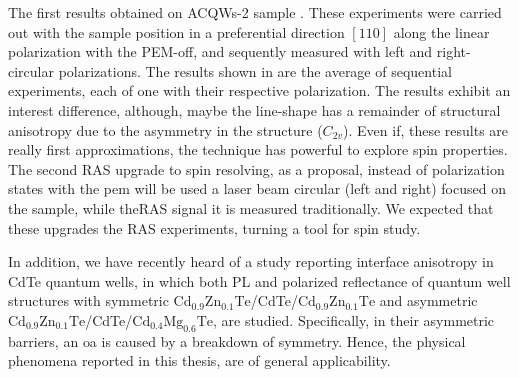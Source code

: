 The first results obtained on \gls{ACQWs}-2 sample  . 
These experiments were carried out with the sample position in a preferential direction  $[110]$ along the linear polarization with the PEM-off, and sequently measured with left and right- circular polarizations.
The results shown in  are the average of sequential experiments, each of one with
their respective polarization. The results exhibit an interest difference, although,
maybe the line-shape has a remainder of structural anisotropy due to the asymmetry in
the structure ($C_{2v}$).  Even if, these results are really first approximations, the technique has powerful to explore spin properties. The second RAS upgrade to spin resolving, as a proposal, instead of polarization states with the \gls{pem} will be used a laser beam circular (left and right) focused on the sample, while the\gls{RAS} signal it is measured traditionally. We expected that these upgrades the RAS experiments, turning a tool for spin study. 

In addition, we have recently heard of a study reporting interface anisotropy in CdTe quantum wells,
in which both PL and polarized reflectance of quantum well structures with symmetric
$\mathrm{Cd_{0.9}Zn_{0.1}Te}$/CdTe/$\mathrm{Cd_{0.9}Zn_{0.1}Te}$ and asymmetric $\mathrm{Cd_{0.9}Zn_{0.1}Te}$/CdTe/$\mathrm{Cd_{0.4}Mg_{0.6}Te}$, are studied\cite{kotova2022manifestation}. Specifically, in their asymmetric barriers, an \gls{oa} is caused by a breakdown of symmetry.
Hence, the physical phenomena reported in this thesis, are of general applicability.



